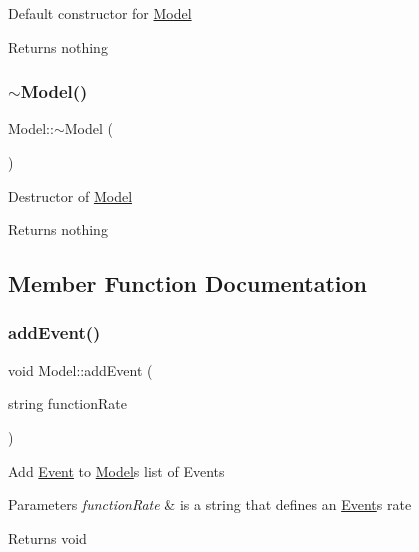 Default constructor for \hyperlink{class_model}{Model}

\begin{DoxyReturn}{Returns}
nothing 
\end{DoxyReturn}
\mbox{\label{class_model_ad6ebd2062a0b823db841a0b88baac4c0}} 
\subsubsection{\texorpdfstring{$\sim$\+Model()}{~Model()}}
{\footnotesize\ttfamily Model\+::$\sim$\+Model (\begin{DoxyParamCaption}{ }\end{DoxyParamCaption})}

Destructor of \hyperlink{class_model}{Model}

\begin{DoxyReturn}{Returns}
nothing 
\end{DoxyReturn}


\subsection{Member Function Documentation}
\mbox{\label{class_model_ab6f784e4ff8cdf3ee5e010ef4dd8d597}} 
\subsubsection{\texorpdfstring{add\+Event()}{addEvent()}}
{\footnotesize\ttfamily void Model\+::add\+Event (\begin{DoxyParamCaption}\item[{string}]{function\+Rate }\end{DoxyParamCaption})}

Add \hyperlink{class_event}{Event} to \hyperlink{class_model}{Model}\textquotesingle{}s list of Events


\begin{DoxyParams}{Parameters}
{\em function\+Rate} & is a string that defines an \hyperlink{class_event}{Event}\textquotesingle{}s rate \\
\hline
\end{DoxyParams}
\begin{DoxyReturn}{Returns}
void 
\end{DoxyReturn}
\mbox{\label{class_model_a78d9b07bd5e819215c9aeefabb4cede7}} 
